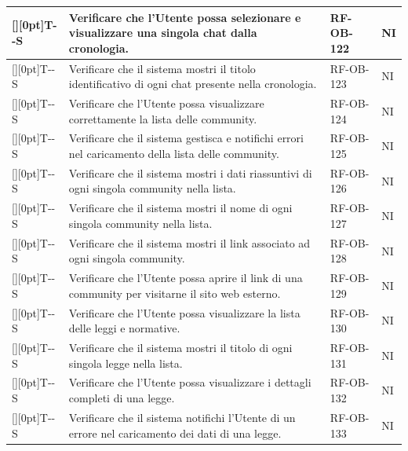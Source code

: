 \documentclass[a4paper,12pt]{article}
\newcounter{testsys}
\newcommand{\systestcode}{%
  \raisebox{0pt}[\height][0pt]{\hypertarget{T-\arabic{testsys}-S}{}}T-\arabic{testsys}-S%
}
\begin{document}
\begin{longtable}{| >{\centering\arraybackslash}p{} | >{\raggedright\arraybackslash}p{} | >{\centering\arraybackslash}p{} | >{\centering\arraybackslash}p{} |}
\stepcounter{testsys} \systestcode & Verificare che l'Utente possa selezionare e visualizzare una singola chat dalla cronologia. & RF-OB-122 & NI \\
\hline

\stepcounter{testsys} \systestcode & Verificare che il sistema mostri il titolo identificativo di ogni chat presente nella cronologia. & RF-OB-123 & NI \\
\hline

\stepcounter{testsys} \systestcode & Verificare che l'Utente possa visualizzare correttamente la lista delle community. & RF-OB-124 & NI \\
\hline

\stepcounter{testsys} \systestcode & Verificare che il sistema gestisca e notifichi errori nel caricamento della lista delle community. & RF-OB-125 & NI \\
\hline

\stepcounter{testsys} \systestcode & Verificare che il sistema mostri i dati riassuntivi di ogni singola community nella lista. & RF-OB-126 & NI \\
\hline

\stepcounter{testsys} \systestcode & Verificare che il sistema mostri il nome di ogni singola community nella lista. & RF-OB-127 & NI \\
\hline

\stepcounter{testsys} \systestcode & Verificare che il sistema mostri il link associato ad ogni singola community. & RF-OB-128 & NI \\
\hline

\stepcounter{testsys} \systestcode & Verificare che l'Utente possa aprire il link di una community per visitarne il sito web esterno. & RF-OB-129 & NI \\
\hline

\stepcounter{testsys} \systestcode & Verificare che l'Utente possa visualizzare la lista delle leggi e normative. & RF-OB-130 & NI \\
\hline

\stepcounter{testsys} \systestcode & Verificare che il sistema mostri il titolo di ogni singola legge nella lista. & RF-OB-131 & NI \\
\hline

\stepcounter{testsys} \systestcode & Verificare che l'Utente possa visualizzare i dettagli completi di una legge. & RF-OB-132 & NI \\
\hline

\stepcounter{testsys} \systestcode & Verificare che il sistema notifichi l'Utente di un errore nel caricamento dei dati di una legge. & RF-OB-133 & NI \\
\hline


\end{longtable}
\end{document}
